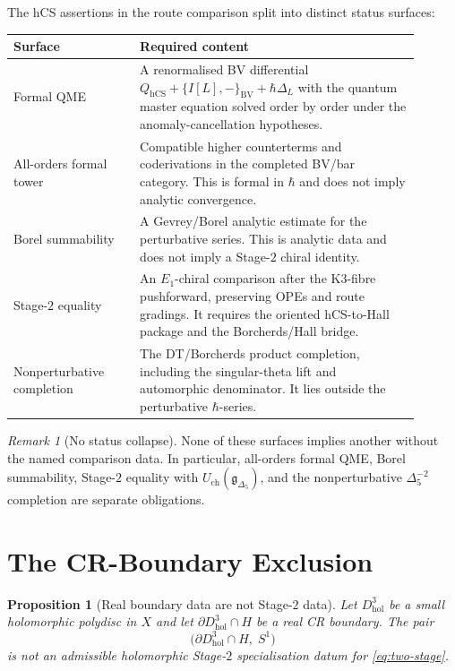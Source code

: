 \documentclass[11pt]{amsart}
\theoremstyle{plain}
\newtheorem{proposition}[theorem]{Proposition}
\theoremstyle{definition}
\theoremstyle{remark}
\newtheorem{remark}[theorem]{Remark}
\providecommand{\hCS}{\mathrm{hCS}}
\providecommand{\Eone}{E_1}
\providecommand{\Delt}{\Delta_{5}}
\providecommand{\Gdelta}{\mathfrak g_{\Delta_{5}}}
\begin{document}
The hCS assertions in the route comparison split into distinct status
surfaces:
\begin{center}
\renewcommand{\arraystretch}{1.25}
\begin{tabular}{p{0.28\linewidth}|p{0.62\linewidth}}
Surface & Required content \\\hline
Formal QME & A renormalised BV differential
$Q_{\hCS}+\{I[L],-\}_{\mathrm{BV}}+\hbar\Delta_L$ with the quantum
master equation solved order by order under the anomaly-cancellation
hypotheses. \\
All-orders formal tower & Compatible higher counterterms and
coderivations in the completed BV/bar category.  This is formal in
$\hbar$ and does not imply analytic convergence. \\
Borel summability & A Gevrey/Borel analytic estimate for the perturbative
series.  This is analytic data and does not imply a Stage-$2$ chiral
identity. \\
Stage-$2$ equality & An $\Eone$-chiral comparison after the K3-fibre
pushforward, preserving OPEs and route gradings.  It requires the
oriented hCS-to-Hall package and the Borcherds/Hall bridge. \\
Nonperturbative completion & The DT/Borcherds product completion,
including the singular-theta lift and automorphic denominator.  It lies
outside the perturbative $\hbar$-series. \\
\end{tabular}
\end{center}

\begin{remark}[No status collapse]
\label{rem:no-status-collapse}
None of these surfaces implies another without the named comparison
data.  In particular, all-orders formal QME, Borel summability,
Stage-$2$ equality with $U_{\mathrm{ch}}(\Gdelta)$, and the
nonperturbative $\Delt^{-2}$ completion are separate obligations.
\end{remark}

\section{The CR-Boundary Exclusion}
\label{sec:cr-boundary-exclusion}

\begin{proposition}[Real boundary data are not Stage-$2$ data]
\label{prop:real-boundary-not-stage2}
Let $D_{\mathrm{hol}}^3$ be a small holomorphic polydisc in $X$ and let
$\partial D_{\mathrm{hol}}^3\cap H$ be a real CR boundary.  The pair
\[
 \bigl(\partial D_{\mathrm{hol}}^3\cap H,\;S^1\bigr)
\]
is not an admissible holomorphic Stage-$2$ specialisation datum for
\eqref{eq:two-stage}.
\end{proposition}
\end{document}
